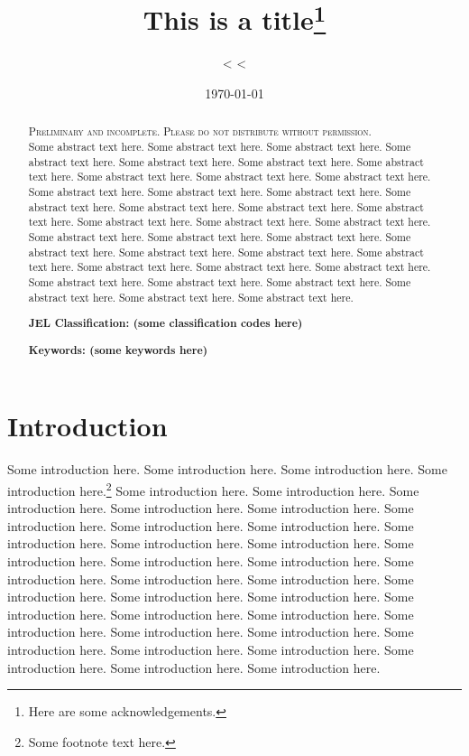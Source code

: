 \documentclass[11pt,twoside]{article}
\title{This is a title\footnote{Here are some acknowledgements.}}
\author{
  <%
  <%
}
\date{\today}
\theoremstyle{plain}
\theoremstyle{definition}
\theoremstyle{remark}
\begin{document}
\maketitle

\begin{abstract}
\textsc{Preliminary and incomplete. Please do not distribute without permission.} \\

Some abstract text here. Some abstract text here. Some abstract text here. Some abstract text here.
Some abstract text here. Some abstract text here. Some abstract text here. Some abstract text here.
Some abstract text here. Some abstract text here. Some abstract text here. Some abstract text here.
Some abstract text here. Some abstract text here. Some abstract text here. Some abstract text here.
Some abstract text here. Some abstract text here. Some abstract text here. Some abstract text here.
Some abstract text here. Some abstract text here. Some abstract text here. Some abstract text here.
Some abstract text here. Some abstract text here. Some abstract text here. Some abstract text here.
Some abstract text here. Some abstract text here. Some abstract text here. Some abstract text here.
Some abstract text here. Some abstract text here. Some abstract text here. Some abstract text here.

\vspace{20pt}

\noindent \scriptsize{\textbf{JEL Classification: (some classification codes here)}}

\noindent \scriptsize{\textbf{Keywords: (some keywords here)}}


\end{abstract}



\newpage

\section{Introduction} %
\label{sec:introduction}

Some introduction here. Some introduction here. Some introduction here. Some introduction here.\footnote{Some footnote text here.}
Some introduction here. Some introduction here. Some introduction here. Some introduction here.
Some introduction here. Some introduction here. Some introduction here. Some introduction here.
Some introduction here. Some introduction here. Some introduction here. Some introduction here.
Some introduction here. Some introduction here. Some introduction here. Some introduction here.
Some introduction here. Some introduction here. Some introduction here. Some introduction here.
Some introduction here. Some introduction here. Some introduction here. Some introduction here.
Some introduction here. Some introduction here. Some introduction here. Some introduction here.
Some introduction here. Some introduction here. Some introduction here. Some introduction here.
\end{document}
